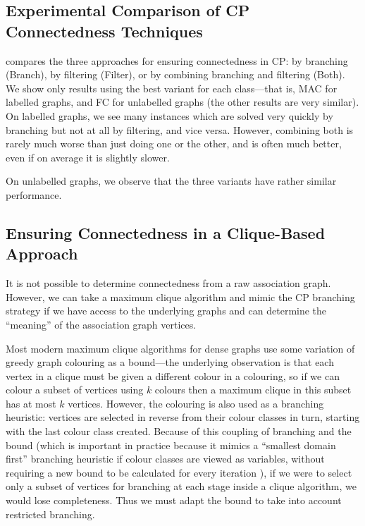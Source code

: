 \documentclass{llncs}
\begin{document}
\subsection{Experimental Comparison of CP Connectedness Techniques}\label{mccs-cp-eval}

 compares the three approaches for ensuring connectedness in CP: by
branching (Branch), by filtering (Filter), or by combining branching and filtering (Both). We show
only results using the best variant for each class---that is, MAC for labelled graphs, and FC for
unlabelled graphs (the other results are very similar).  On labelled graphs, we see many instances
which are solved very quickly by branching but not at all by filtering, and vice versa.  However,
combining both is rarely much worse than just doing one or the other, and is often much better, even
if on average it is slightly slower.

On unlabelled graphs, we observe that the three variants have rather similar performance.

\subsection{Ensuring Connectedness in a Clique-Based Approach}\label{mccs-clique}

It is not possible to determine connectedness from a raw association graph. However, we can take a
maximum clique algorithm and mimic the CP branching strategy if we have access to the underlying
graphs and can determine the ``meaning'' of the association graph vertices.

Most modern maximum clique algorithms for dense graphs use some variation of greedy graph colouring
as a bound---the underlying observation is that each vertex in a clique must be given a different
colour in a colouring, so if we can colour a subset of vertices using $k$ colours then a maximum
clique in this subset has at most $k$ vertices. However, the colouring is also used as a branching
heuristic: vertices are selected in reverse from their colour classes in turn, starting with the
last colour class created. Because of this coupling of branching and the bound (which is important
in practice because it mimics a ``smallest domain first'' branching heuristic if colour classes are
viewed as variables, without requiring a new bound to be calculated for every iteration
\cite{DBLP:conf/cp/McCreeshP14}), if we were to select only a subset of vertices for branching at
each stage inside a clique algorithm, we would lose completeness. Thus we must adapt the bound to
take into account restricted branching.
\end{document}
